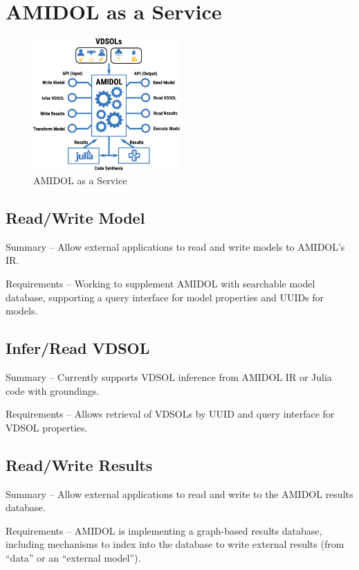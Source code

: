 \documentclass[12pt]{galois-whitepaper}
\begin{document}
\section{AMIDOL as a Service}

\begin{figure}
  \centering
  \includegraphics[width=0.5\textwidth]{figs/AMIDOL-service.png}
  \caption{AMIDOL as a Service}
  \label{Fig:Service}
\end{figure}

\subsection{Read/Write Model}

Summary – Allow external applications to read and write models to AMIDOL’s IR.

Requirements – Working to supplement AMIDOL with searchable model database, supporting a query interface for model properties and UUIDs for models.

\subsection{Infer/Read VDSOL}

Summary – Currently supports VDSOL inference from AMIDOL IR or Julia code with groundings.

Requirements – Allows retrieval of VDSOLs by UUID and query interface for VDSOL properties.

\subsection{Read/Write Results}

Summary – Allow external applications to read and write to the AMIDOL results database.

Requirements – AMIDOL is implementing a graph-based results database,
including mechanisms to index into the database to write external
results (from “data” or an “external model”).
\end{document}
